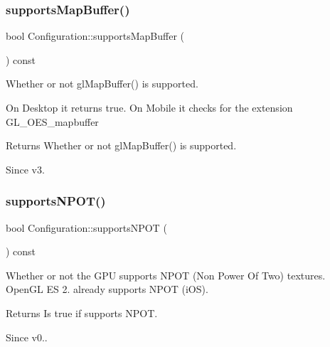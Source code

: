\subsubsection{\texorpdfstring{supports\+Map\+Buffer()}{supportsMapBuffer()}\hspace{0.1cm}{\footnotesize\ttfamily [2/2]}}
{\footnotesize\ttfamily bool Configuration\+::supports\+Map\+Buffer (\begin{DoxyParamCaption}{ }\end{DoxyParamCaption}) const}

Whether or not gl\+Map\+Buffer() is supported.

On Desktop it returns {\ttfamily true}. On Mobile it checks for the extension {\ttfamily G\+L\+\_\+\+O\+E\+S\+\_\+mapbuffer}

\begin{DoxyReturn}{Returns}
Whether or not {\ttfamily gl\+Map\+Buffer()} is supported. 
\end{DoxyReturn}
\begin{DoxySince}{Since}
v3. 
\end{DoxySince}
\mbox{\label{classConfiguration_a48e53be56a6224f95193a36cd1a5e676}} 
\subsubsection{\texorpdfstring{supports\+N\+P\+O\+T()}{supportsNPOT()}\hspace{0.1cm}{\footnotesize\ttfamily [1/2]}}
{\footnotesize\ttfamily bool Configuration\+::supports\+N\+P\+OT (\begin{DoxyParamCaption}{ }\end{DoxyParamCaption}) const}

Whether or not the G\+PU supports N\+P\+OT (Non Power Of Two) textures. Open\+GL ES 2. already supports N\+P\+OT (i\+OS).

\begin{DoxyReturn}{Returns}
Is true if supports N\+P\+OT. 
\end{DoxyReturn}
\begin{DoxySince}{Since}
v0.. 
\end{DoxySince}
\mbox{\label{classConfiguration_a48e53be56a6224f95193a36cd1a5e676}} 
